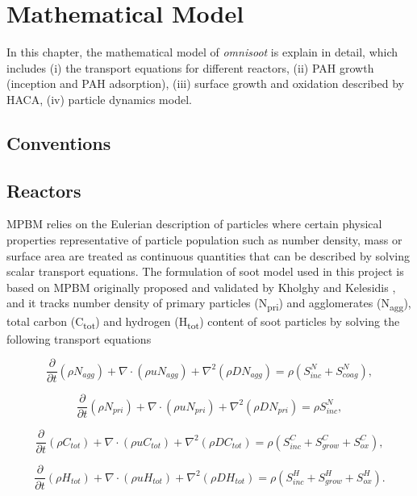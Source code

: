 \chapter{Mathematical Model}
In this chapter,  the mathematical model of \textit{omnisoot} is explain in detail, which includes (i) the transport equations for different reactors, (ii) PAH growth (inception and PAH adsorption), (iii) surface growth and oxidation described by HACA, (iv) particle dynamics model. 

\section{Conventions}


\section{Reactors}
MPBM relies on the Eulerian description of particles where certain physical properties representative of particle population such as number density, mass or surface area are treated as continuous quantities that can be described by solving scalar transport equations. The formulation of soot model used in this project is based on MPBM originally proposed and validated by Kholghy and Kelesidis \cite{Kholghy2021}, and it tracks number density of primary particles (N\textsubscript{pri}) and agglomerates (N\textsubscript{agg}), total carbon (C\textsubscript{tot}) and hydrogen (H\textsubscript{tot}) content of soot particles by solving the following transport equations

\begin{equation}
	\frac{\partial}{\partial t}(\rho N_{agg}) + \nabla\cdot(\rho u N_{agg})+\nabla^2(\rho D N_{agg}) = \rho\left( S^N_{inc} + S^N_{coag} \right)
	\label{eqn:N_agg},
\end{equation}

\begin{equation}
	\frac{\partial}{\partial t}(\rho N_{pri}) + \nabla\cdot(\rho u N_{pri})+\nabla^2(\rho D N_{pri}) = \rho S^N_{inc}
	\label{eqn:N_pri},
\end{equation}

\begin{equation}
	\frac{\partial}{\partial t}(\rho C_{tot}) + \nabla\cdot(\rho u C_{tot})+\nabla^2(\rho D C_{tot}) = \rho\left( S^C_{inc} + S^C_{grow} + S^C_{ox} \right)
	\label{eqn:C_tot},
\end{equation}

\begin{equation}
	\frac{\partial}{\partial t}(\rho H_{tot}) + \nabla\cdot(\rho u H_{tot})+\nabla^2(\rho D H_{tot}) = \rho\left( S^H_{inc} + S^H_{grow} + S^H_{ox} \right)
	\label{eqn:H_tot}.
\end{equation}

